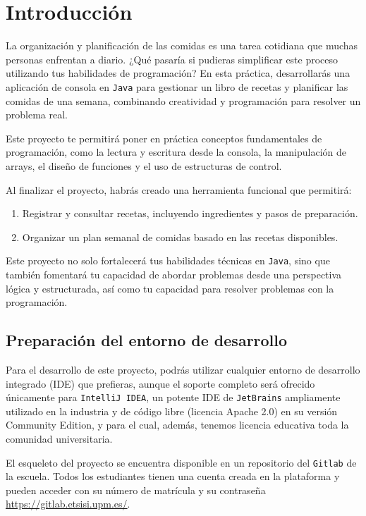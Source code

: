 \documentclass[
    a4paper, %
    12pt, %
]{CSSullivanBusinessReport}
\begin{document}
\section{Introducción}
La organización y planificación de las comidas es una tarea cotidiana que muchas personas enfrentan a diario. ¿Qué pasaría si pudieras simplificar este proceso utilizando tus habilidades de programación? En esta práctica, desarrollarás una aplicación de consola en \texttt{Java} para gestionar un libro de recetas y planificar las comidas de una semana, combinando creatividad y programación para resolver un problema real.

Este proyecto te permitirá poner en práctica conceptos fundamentales de programación, como la lectura y escritura desde la consola, la manipulación de arrays, el diseño de funciones y el uso de estructuras de control.

Al finalizar el proyecto, habrás creado una herramienta funcional que permitirá:
\begin{enumerate}
    \item Registrar y consultar recetas, incluyendo ingredientes y pasos de preparación.
    \item Organizar un plan semanal de comidas basado en las recetas disponibles.
\end{enumerate}

Este proyecto no solo fortalecerá tus habilidades técnicas en \texttt{Java}, sino que también fomentará tu capacidad de abordar problemas desde una perspectiva lógica y estructurada, así como tu capacidad para resolver problemas con la programación.

\subsection{Preparación del entorno de desarrollo} %

Para el desarrollo de este proyecto, podrás utilizar cualquier entorno de desarrollo integrado (IDE) que prefieras, aunque el soporte completo será ofrecido únicamente para \texttt{IntelliJ IDEA}, un potente IDE de \texttt{JetBrains} ampliamente utilizado en la industria y de código libre (licencia Apache 2.0) en su versión Community Edition, y para el cual, además, tenemos licencia educativa toda la comunidad universitaria.

El esqueleto del proyecto se encuentra disponible en un repositorio del \texttt{Gitlab} de la escuela. Todos los estudiantes tienen una cuenta creada en la plataforma y pueden acceder con su número de matrícula y su contraseña \url{https://gitlab.etsisi.upm.es/}.
\end{document}
